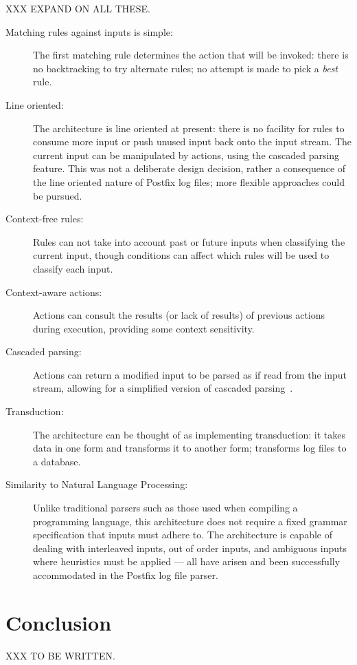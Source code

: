 \label{Architecture characteristics}

XXX EXPAND ON ALL THESE\@.

\begin{description}

    \item [Matching rules against inputs is simple:]  The first matching
        rule determines the action that will be invoked: there is no
        backtracking to try alternate rules; no attempt is made to pick a
        \textit{best\/} rule.

    \item [Line oriented:]  The architecture is line oriented at present:
        there is no facility for rules to consume more input or push unused
        input back onto the input stream.  The current input can be
        manipulated by actions, using the cascaded parsing feature.  This
        was not a deliberate design decision, rather a consequence of the
        line oriented nature of Postfix log files; more flexible approaches
        could be pursued.

    \item [Context-free rules:]  Rules can not take into account past or
        future inputs when classifying the current input, though conditions
        can affect which rules will be used to classify each input.

    \item [Context-aware actions:] Actions can consult the results (or lack
        of results) of previous actions during execution, providing some
        context sensitivity.

    \item [Cascaded parsing:] Actions can return a modified input to be
        parsed as if read from the input stream, allowing for a simplified
        version of cascaded parsing~\cite{cascaded-parsing}.

    \item [Transduction:]  The architecture can be thought of as
        implementing transduction: it takes data in one form
        and transforms it to another form; \parsername{} transforms log
        files to a database.

    \item [Similarity to Natural Language Processing:] Unlike traditional
        parsers such as those used when compiling a programming language,
        this architecture does not require a fixed grammar specification
        that inputs must adhere to.  The architecture is capable of dealing
        with interleaved inputs, out of order inputs, and ambiguous inputs
        where heuristics must be applied --- all have arisen and been
        successfully accommodated in the Postfix log file parser.

\end{description}


\section{Conclusion}

XXX TO BE WRITTEN\@.
